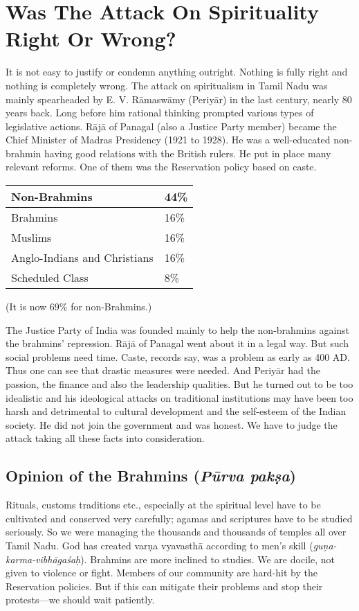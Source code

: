 \section*{Was The Attack On Spirituality Right Or Wrong?}

It is not easy to justify or condemn anything outright. Nothing is fully right and nothing is completely wrong. The attack on spiritualism in Tamil Nadu was mainly spearheaded by E. V. Rāmaswāmy (Periyār) in the last century, nearly 80 years back. Long before him rational thinking prompted various types of legislative actions. Rājā of Panagal (also a Justice Party member) became the Chief Minister of Madras Presidency (1921 to 1928). He was a well-educated non-brahmin having good relations with the British rulers. He put in place many relevant reforms. One of them was the Reservation policy based on caste.

\begin{longtable}{@{}|l|l|@{}}
\hline
Non-Brahmins & 44\% \\
\hline
Brahmins & 16\% \\
\hline
Muslims & 16\% \\
\hline
Anglo-Indians and Christians & 16\% \\
\hline
Scheduled Class & 8\% \\
\hline
\end{longtable}

(It is now 69\% for non-Brahmins.)

The Justice Party of India was founded mainly to help the non-brahmins against the brahmins’ repression. Rājā of Panagal went about it in a legal way. But such social problems need time. Caste, records say, was a problem as early as 400 AD. Thus one can see that drastic measures were needed. And Periyār had the passion, the finance and also the leadership qualities. But he turned out to be too idealistic and his ideological attacks on traditional institutions may have been too harsh and detrimental to cultural development and the self-esteem of the Indian society. He did not join the government and was honest. We have to judge the attack taking all these facts into consideration.

\subsection*{Opinion of the Brahmins (\textit{Pūrva pakṣa})}

Rituals, customs traditions etc., especially at the spiritual level have to be cultivated and conserved very carefully; agamas and scriptures have to be studied seriously. So we were managing the thousands and thousands of temples all over Tamil Nadu. God has created varņa vyavasthā according to men’s skill (\textit{guņa-karma-vibhāgaśaḥ}). Brahmins are more inclined to studies. We are docile, not given to violence or fight. Members of our community are hard-hit by the Reservation policies. But if this can mitigate their problems and stop their protests—we should wait patiently.


